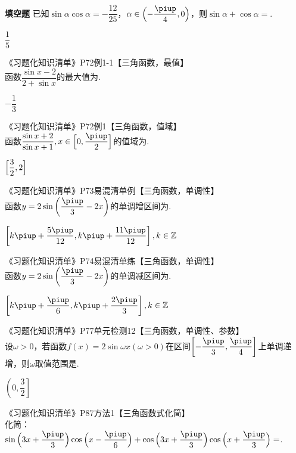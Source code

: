 \begin{exercise}{\bf 填空题}
      已知$\sin\alpha\cos\alpha=-\dfrac{12}{25}$，$\alpha\in\Bigl(-\dfrac{\piup}4,0\Bigr)$，则$\sin\alpha+\cos\alpha=$\tk.
      \begin{answer}
        $\dfrac{1}{5}$
      \end{answer}
    \item 《习题化知识清单》P72例1-1【三角函数，最值】\\
      函数$\dfrac{\sin x-2}{2+\sin x}$的最大值为\tk.
      \begin{answer}
        $-\dfrac13$
      \end{answer}
    \item 《习题化知识清单》P72例1【三角函数，值域】\\
      函数$\dfrac{\sin x+2}{\sin x+1},x\in\Bigl[0,\dfrac{\piup}2\Bigr]$的值域为\tk.
      \begin{answer}
        $\Bigl[\dfrac32,2\Bigr]$
      \end{answer}
    \item 《习题化知识清单》P73易混清单例【三角函数，单调性】\\
      函数$y=2\sin\left(\dfrac{\piup}3-2x \right)$的单调增区间为\tk.
      \begin{answer}
        $\left[k\piup+\dfrac{5\piup}{12},k\piup+\dfrac{11\piup}{12} \right],k\in\mathbb{Z}$
      \end{answer}
    \item 《习题化知识清单》P74易混清单练【三角函数，单调性】\\
      函数$y=2\sin\left(\dfrac{\piup}3-2x \right)$的单调减区间为\tk.
      \begin{answer}
        $\left[k\piup+\dfrac{\piup}6,k\piup+\dfrac{2\piup}3 \right],k\in\mathbb{Z}$
      \end{answer}
    \item 《习题化知识清单》P77单元检测12【三角函数，单调性、参数】\\
      设$\omega>0$，若函数$f(x)=2\sin \omega x(\omega>0)$在区间$\left[-\dfrac{\piup}3,\dfrac{\piup}4 \right]$上单调递增，则$\omega$取值范围是\tk.
      \begin{answer}
        $\left(0,\dfrac32\right]$
      \end{answer}
    \item 《习题化知识清单》P87方法1【三角函数式化简】\\
      化简：
      $\sin{\Bigl(3x+\dfrac{\piup}3\Bigr)}\cos{\Bigl(x-\dfrac{\piup}6\Bigr)}+\cos{\Bigl(3x+\dfrac{\piup}3\Bigr)}\cos{\Bigl(x+\dfrac{\piup}3\Bigr)}=$\tk.
      \begin{answer}

\end{answer}
\end{exercise}
